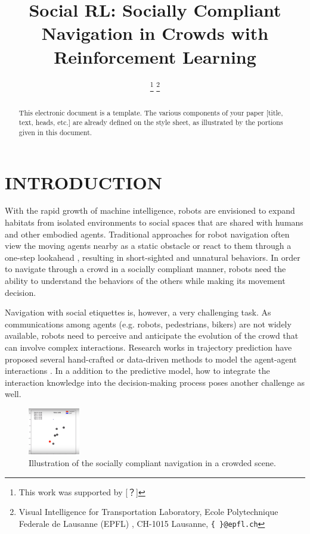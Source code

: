 \documentclass[letterpaper, 10 pt, conference]{ieeeconf}  %
\title{\Large \bf Social RL: Socially Compliant Navigation in Crowds
with Reinforcement Learning}
\author{%
\thanks{This work was supported by [？]}%
\thanks{Visual Intelligence for Transportation Laboratory, Ecole Polytechnique Federale de Lausanne (EPFL)
, CH-1015 Lausanne,
        {\tt\small \{ \}@epfl.ch}}%
}
\begin{document}

\maketitle
\thispagestyle{empty}
\pagestyle{empty}

\begin{abstract}
This electronic document is a template. The various components of your paper [title, text, heads, etc.] are already defined on the style sheet, as illustrated by the portions given in this document.

\vspace{5cm}

\end{abstract}


\section{INTRODUCTION} \label{sec:intro}

With the rapid growth of machine intelligence, robots are envisioned to expand habitats from isolated environments to social spaces that are shared with humans and other embodied agents. Traditional approaches for robot navigation often view the moving agents nearby as a static obstacle \cite{fox_dynamic_1997} or react to them through a one-step lookahead \cite{berg_reciprocal_2008}, resulting in short-sighted and unnatural behaviors. In order to navigate through a crowd in a socially compliant manner, robots need the ability to understand the behaviors of the others while making its movement decision. 

Navigation with social etiquettes is, however, a very challenging task. As communications among agents (e.g. robots, pedestrians, bikers) are not widely available, robots need to perceive and anticipate the evolution of the crowd that can involve complex interactions. Research works in trajectory prediction have proposed several hand-crafted or data-driven methods to model the agent-agent interactions \cite{helbing_social_1995,alahi_social_2016,vemula_social_2017,gupta_social_2018}. In a addition to the predictive model, how to integrate the interaction knowledge into the decision-making process poses another challenge as well. 

\begin{figure} [h]
  \captionsetup{font=small}
  \includegraphics[width=0.2\textwidth]{figures/overview}
  \caption{Illustration of the socially compliant navigation in a crowded scene.}
  \label{fig:overview}
\end{figure}
\end{document}
